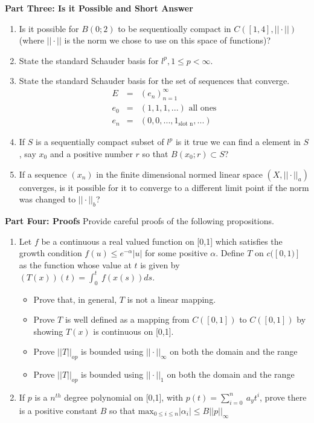 \documentclass[11pt]{SelfArxOneColBMN}
\begin{document}
\textbf{Part Three: Is it Possible and Short Answer}
\begin{enumerate}
  \item Is it possible for $B(0;2)$ to be sequentioally compact in $C([1,4],||\cdot||)$ (where $||\cdot||$ is the norm we chose to use on this space of functions)?
  \item State the standard Schauder basis for $l^p, 1 \leq p < \infty$.
  \item State the standard Schauder basis for the set of sequences that converge.
  \begin{eqnarray*}
     E &=& (e_n)^\infty_{n=1}\\
     e_0 &=& (1,1,1,...) \text{ all ones}\\
     e_n &=& (0, 0,...,1_{\text{slot n}},...)
  \end{eqnarray*}
  \item If $S$ is a sequentially compact subset of $l^p$ is it true we can find a element in $S$, say $x_0$ and a positive number $r$ so that $B(x_0;r) \subset S$?
  \item If a sequence $(x_n)$ in the finite dimensional normed linear space $(X,||\cdot||_a)$ converges, is it possible for it to converge to a different limit point if the norm was changed to $||\cdot||_b$?
\end{enumerate}

\textbf{Part Four: Proofs}
Provide careful proofs of the following propositions.
\begin{enumerate}
  \item Let $f$ be a continuous a real valued function on [0,1] which satisfies the growth condition $f(u) \leq e^{-\alpha}|u|$ for some positive $\alpha$. Define $T$ on $c([0,1)]$ as the function whose value at $t$ is given by $(T(x))(t) = \int_0^t\:f(x(s))ds$.
  \begin{itemize}
    \item Prove that, in general, $T$ is not a linear mapping.
    \item Prove $T$ is well defined as a mapping from $C([0,1])$ to $C([0,1])$ by showing $T(x)$ is continuous on [0,1].
    \item Prove $||T||_{op}$ is bounded using $||\cdot||_{\infty}$ on both the domain and the range
    \item Prove $||T||_{op}$ is bounded using $||\cdot||_1$ on both the domain and the range
  \end{itemize}
  \item If $p$ is a $n^{th}$ degree polynomial on [0,1], with $p(t) = \sum_{i=0}^n\: a_y t^i$, prove there is a positive constant $B$ so that $\text{max}_{0 \leq i \leq n}|\alpha_i| \leq B||p||_{\infty}$
\end{enumerate}
\end{document}
